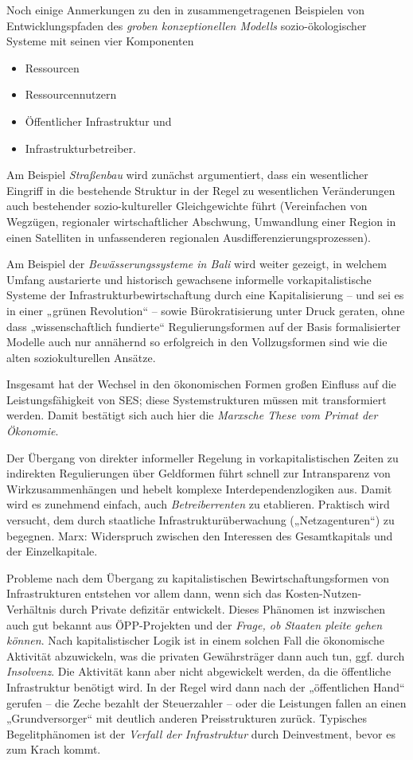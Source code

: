 \documentclass[11pt,a4paper]{article}
\begin{document}
Noch einige Anmerkungen zu den in \cite{Anderies2004} zusammengetragenen
Beispielen von Entwicklungspfaden des \emph{groben konzeptionellen Modells}
sozio-ökologischer Systeme mit seinen vier Komponenten
\begin{itemize}[noitemsep]
\item Ressourcen
\item Ressourcennutzern
\item Öffentlicher Infrastruktur und
\item Infrastrukturbetreiber.
\end{itemize}

Am Beispiel \emph{Straßenbau} wird zunächst argumentiert, dass ein
wesentlicher Eingriff in die bestehende Struktur in der Regel zu wesentlichen
Veränderungen auch bestehender sozio-kultureller Gleichgewichte führt
(Vereinfachen von Wegzügen, regionaler wirtschaftlicher Abschwung, Umwandlung
einer Region in einen Satelliten in unfassenderen regionalen
Ausdifferenzierungsprozessen).

Am Beispiel der \emph{Bewässerungssysteme in Bali} wird weiter gezeigt, in
welchem Umfang austarierte und historisch gewachsene informelle
vorkapitalistische Systeme der Infrastrukturbewirtschaftung durch eine
Kapitalisierung -- und sei es in einer „grünen Revolution“ -- sowie
Bürokratisierung unter Druck geraten, ohne dass „wissenschaftlich fundierte“
Regulierungsformen auf der Basis formalisierter Modelle auch nur annähernd so
erfolgreich in den Vollzugsformen sind wie die alten soziokulturellen Ansätze.

Insgesamt hat der Wechsel in den ökonomischen Formen großen Einfluss auf die
Leistungs\-fähigkeit von SES; diese Systemstrukturen müssen mit transformiert
werden. Damit bestätigt sich auch hier die \emph{Marxsche These vom Primat der
  Ökonomie}.

Der Übergang von direkter informeller Regelung in vorkapitalistischen Zeiten
zu indirekten Regulierungen über Geldformen führt schnell zur Intransparenz
von Wirkzusammenhängen und hebelt komplexe Interdependenzlogiken aus. Damit
wird es zunehmend einfach, auch \emph{Betreiberrenten} zu etablieren.
Praktisch wird versucht, dem durch staatliche Infrastrukturüber\-wachung
(„Netzagenturen“) zu begegnen.  Marx: Widerspruch zwischen den Interessen des
Gesamtkapitals und der Einzelkapitale.

Probleme nach dem Übergang zu kapitalistischen Bewirtschaftungsformen von
Infrastrukturen entstehen vor allem dann, wenn sich das
Kosten-Nutzen-Verhältnis durch Private defizitär entwickelt. Dieses Phänomen
ist inzwischen auch gut bekannt aus ÖPP-Projekten und der \emph{Frage, ob
  Staaten pleite gehen können}. Nach kapitalistischer Logik ist in einem
solchen Fall die ökonomische Aktivität abzuwickeln, was die privaten
Gewährsträger dann auch tun, ggf. durch \emph{Insolvenz}. Die Aktivität kann
aber nicht abgewickelt werden, da die öffentliche Infrastruktur benötigt
wird. In der Regel wird dann nach der „öffentlichen Hand“ gerufen -- die Zeche
bezahlt der Steuerzahler -- oder die Leistungen fallen an einen
„Grundversorger“ mit deutlich anderen Preisstrukturen zurück. Typisches
Begelitphänomen ist der \emph{Verfall der Infrastruktur} durch Deinvestment,
bevor es zum Krach kommt.
\end{document}
